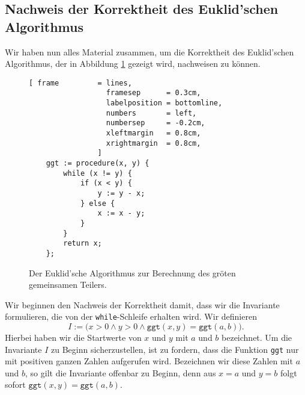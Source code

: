 \subsection{Nachweis der Korrektheit des Euklid'schen Algorithmus}
Wir haben nun alles Material zusammen, um die Korrektheit des Euklid'schen Algorithmus,
der in Abbildung
\ref{fig:ggt.c} gezeigt wird, nachweisen zu k\"onnen.

\begin{figure}[!ht]
\centering
\begin{Verbatim}[ frame         = lines, 
                  framesep      = 0.3cm, 
                  labelposition = bottomline,
                  numbers       = left,
                  numbersep     = -0.2cm,
                  xleftmargin   = 0.8cm,
                  xrightmargin  = 0.8cm,
                ]
    ggt := procedure(x, y) {
        while (x != y) {
            if (x < y) {
                y := y - x;
            } else {
                x := x - y;
            }
        }
        return x;
    };
\end{Verbatim}
\vspace*{-0.3cm}
\caption{Der Euklid'sche Algorithmus zur Berechnung des gr\"o\3ten gemeinsamen Teilers.}
\label{fig:ggt.c}
\end{figure}

Wir beginnen den Nachweis der Korrektheit damit, dass wir die Invariante formulieren, die
von der \texttt{while}-Schleife erhalten wird.  Wir definieren
\[ I := \bigl(x > 0 \wedge y > 0 \wedge \texttt{ggt}(x,y) = \texttt{ggt}(a,b) \bigr).
\]
Hierbei haben wir die Startwerte von $x$ und $y$ mit $a$ und $b$ bezeichnet.
Um die Invariante $I$ zu Beginn sicherzustellen, ist zu fordern, dass die Funktion
\texttt{ggt} nur mit positiven ganzen Zahlen aufgerufen wird.  Bezeichnen wir diese Zahlen
mit $a$ und $b$, so gilt die Invariante offenbar zu Beginn, denn aus $x = a$ und $y = b$
folgt sofort $\texttt{ggt}(x,y) = \texttt{ggt}(a,b)$.

